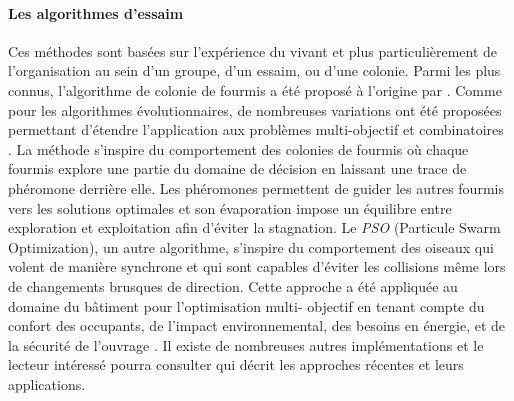 \paragraph{Les algorithmes d’essaim} %
\label{par:les_algorithmes_d_essaim}
Ces méthodes sont basées sur l’expérience du vivant et plus particulièrement de
l’organisation au sein d’un groupe, d’un essaim, ou d’une colonie. Parmi les plus connus,
l’algorithme de colonie de fourmis a été proposé à l’origine par \textcite{Colorni1992509}.
Comme pour les algorithmes évolutionnaires, de nombreuses variations ont été proposées
permettant d’étendre l’application aux problèmes multi-objectif et combinatoires
\parencite{MichaelGuntsch2003,Shea2006627}.
La méthode s’inspire du comportement des colonies de fourmis où chaque fourmis
explore une partie du domaine de décision en laissant une trace de phéromone
derrière elle. Les phéromones permettent de guider les autres fourmis vers les
solutions optimales et son évaporation impose un équilibre entre exploration et
exploitation afin d’éviter la stagnation.
Le \textit{PSO} (Particule Swarm Optimization), un autre algorithme, s’inspire du
comportement des oiseaux qui volent de manière synchrone et qui sont capables
d’éviter les collisions même lors de changements brusques de direction. Cette
approche a été appliquée au domaine du bâtiment pour l’optimisation multi-
objectif en tenant compte du confort des occupants, de l’impact environnemental,
des besoins en énergie, et de la sécurité de l’ouvrage \parencite{Armand-Decker2015}.
Il existe de nombreuses autres implémentations et le lecteur intéressé pourra
consulter \textcite{Aboul-EllaHassanien2015} qui décrit les approches récentes et
leurs applications.


